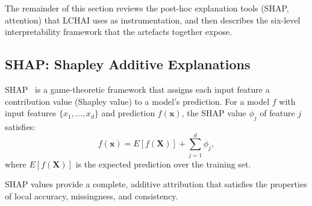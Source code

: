 The remainder of this section reviews the post-hoc explanation
tools (SHAP, attention) that LCHAI uses as instrumentation, and
then describes the six-level interpretability framework that the
artefacts together expose.

\subsection{SHAP: Shapley Additive Explanations}
\label{sec:bg:shap}

SHAP~\cite{lundberg2017shap} is a game-theoretic framework that assigns each input feature a contribution value (Shapley value) to a model's prediction.
For a model $f$ with input features $\{x_1, \ldots, x_d\}$ and prediction $f(\mathbf{x})$, the SHAP value $\phi_j$ of feature $j$ satisfies:
\begin{equation}
\label{eq:shap}
f(\mathbf{x}) = E[f(\mathbf{X})] + \sum_{j=1}^{d} \phi_j,
\end{equation}
where $E[f(\mathbf{X})]$ is the expected prediction over the training set.

SHAP values provide a complete, additive attribution that satisfies the properties of local accuracy, missingness, and consistency.

